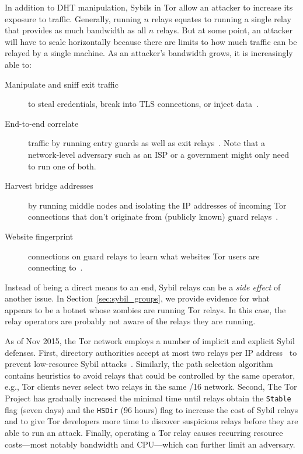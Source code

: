 In addition to DHT manipulation, Sybils in Tor allow an attacker to increase its
exposure to traffic.  Generally, running $n$ relays equates to running a single
relay that provides as much bandwidth as all $n$ relays.  But at some point, an
attacker will have to scale horizontally because there are limits to how much
traffic can be relayed by a single machine.  As an attacker's bandwidth grows,
it is increasingly able to:
\begin{description}
	\item[Manipulate and sniff exit traffic] to steal credentials, break into
		TLS connections, or inject data~\cite{Winter2014a}.
	\item[End-to-end correlate] traffic by running entry guards as well as exit
		relays~\cite{Johnson2013a}.  Note that a network-level adversary such as
		an ISP or a government might only need to run one of both.
	\item[Harvest bridge addresses] by running middle nodes and isolating the
		IP addresses of incoming Tor connections that don't originate from
		(publicly known) guard relays~\cite{Ling2012a}.
	\item[Website fingerprint] connections on guard relays to learn what
		websites Tor users are connecting to~\cite{Juarez2014a}.
\end{description}

Instead of being a direct means to an end, Sybil relays can be a \emph{side
effect} of another issue.  In Section~\ref{sec:sybil_groups}, we provide
evidence for what appears to be a botnet whose zombies are running Tor relays.
In this case, the relay operators are probably not aware of the relays they are
running.

As of Nov 2015, the Tor network employs a number of implicit and explicit
Sybil defenses.  First, directory authorities accept at most two relays per IP
address~\cite{Bauer2007b} to prevent low-resource Sybil
attacks~\cite{Bauer2007a}.  Similarly, the path selection
algorithm~\cite{path-spec} contains heuristics to avoid relays that could be
controlled by the same operator, e.g., Tor clients never select two relays in
the same /16 network.  Second, The Tor Project has gradually increased the
minimal time until relays obtain the \texttt{Stable} flag (seven days) and the
\texttt{HSDir} (96 hours) flag to increase the cost of Sybil relays and to give
Tor developers more time to discover suspicious relays before they are able to
run an attack.  Finally, operating a Tor relay causes recurring resource
costs---most notably bandwidth and CPU---which can further limit an adversary.

